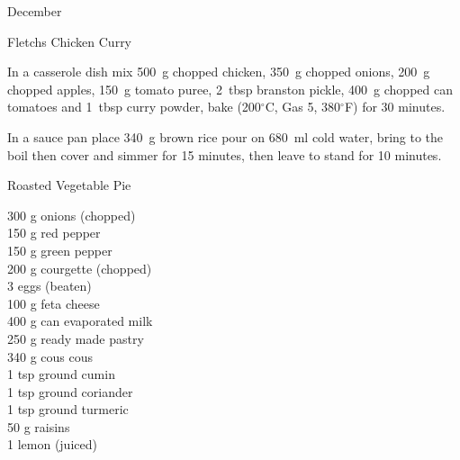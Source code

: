 \begin{menu}{December}
\begin{recipe}{2}{Fletchs Chicken Curry}
\begin{ingredients}
		\end{ingredients}
	
	
	
    \begin{instructions}
    \item 
        In a casserole dish mix
        500~g chopped chicken,
        350~g chopped onions,
        200~g chopped apples,
        150~g  tomato puree,
        2~tbsp  branston pickle,
        400~g chopped can tomatoes
        and
        1~tbsp  curry powder,
        bake (200$^{\circ}$C, Gas 5, 380$^{\circ}$F) for 30 minutes.
      \item 
    In a
    sauce pan
    place
    340~g  brown rice
    pour on
    680~ml  cold water,
    bring to the boil then cover and simmer for 15 minutes,
    then leave to stand for 10 minutes.
  
    \end{instructions}
    \end{recipe}%
  
    \begin{recipe}{2}{Roasted Vegetable Pie}%
		\begin{ingredients}
		300 g onions (chopped) \\
	150 g red pepper  \\
	150 g green pepper  \\
	200 g courgette (chopped) \\
	3  eggs (beaten) \\
	100 g feta cheese  \\
	400 g can evaporated milk  \\
	250 g ready made pastry  \\
	340 g cous cous  \\
	1 tsp ground cumin  \\
	1 tsp ground coriander  \\
	1 tsp ground turmeric  \\
	50 g raisins  \\
	1  lemon (juiced) \\
	
		\end{ingredients}
	
	

\end{recipe}
\end{menu}
